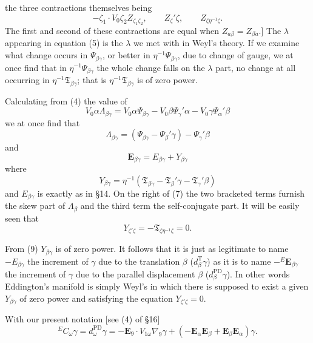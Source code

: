 \documentclass[11pt]{article}
\begin{document}
the three contractions themselves being
\[
-\zeta_1\mathbin{\cdot}V_0\zeta_2Z_{\zeta_1\zeta_2},\qquad Z_\zeta'\zeta,\qquad Z_{\zeta\eta^{-1}\zeta}.
\]
The first and second of these contractions are equal when $Z_{a\beta}=Z_{\beta a}$.]
\indent The $\lambda$ appearing in equation (5) is the $\lambda$ we met with in Weyl's theory. If we examine what change occurs in $\Psi_{\beta\gamma}$, or better in $\eta^{-1}\Psi_{\beta\gamma}$, due to change of gauge, we at once find that in $\eta^{-1}\Psi_{\beta\gamma}$ the whole change falls on the $\lambda$ part, no change at all occurring in $\eta^{-1}\mathfrak{T}_{\beta\gamma}$; that is $\eta^{-1}\mathfrak{T}_{\beta\gamma}$ is of zero power.

\indent Calculating from (4) the value of
\[
V_0\alpha\Lambda_{\beta\gamma}=V_0\alpha\Psi_{\beta\gamma}-V_0\beta\Psi_\gamma'\alpha-V_0\gamma\Psi_\alpha'\beta
\]
we at once find that
\begin{equation}\Lambda_{\beta\gamma}=(\Psi_{\beta\gamma}-\Psi_\beta'\gamma)-\Psi_\gamma'\beta\tag{7}\end{equation}
and
\begin{equation}\mathbf{E}_{\beta\gamma}=E_{\beta\gamma}+Y_{\beta\gamma}\tag{8}\end{equation}
where
\begin{equation}Y_{\beta\gamma}=\eta^{-1}(\mathfrak{T}_{\beta\gamma}-\mathfrak{T}_\beta'\gamma-\mathfrak{T}_\gamma'\beta)\tag{9}\end{equation}
and $E_{\beta\gamma}$ is exactly as in \S14. On the right of (7) the two bracketed terms furnish the skew part of $\Lambda_\beta$ and the third term the self-conjugate part. It will be easily seen that
\begin{equation}Y_{\zeta'\zeta}=-\mathfrak{T}_{\zeta\eta^{-1}\zeta}=0.\tag{10}\end{equation}

\indent From (9) $Y_{\beta\gamma}$ is of zero power. It follows that it is just as legitimate to name $-E_{\beta\gamma}$ the increment of $\gamma$ due to the translation $\beta$ ($d_\beta^{\mathrm T}\gamma$) as it is to name $-{}^E\mathbf{E}_{\beta\gamma}$ the increment of $\gamma$ due to the parallel displacement $\beta$ ($d_\beta^{\mathrm{PD}}\gamma$). In other words Eddington's manifold is simply Weyl's in which there is supposed to exist a given $Y_{\beta\gamma}$ of zero power and satisfying the equation $Y_{\zeta'\zeta}=0$.

\indent With our present notation [see (4) of \S16]
\begin{equation}{}^E C_\omega\gamma=d_\omega^{\mathrm{PD}}\gamma=-\mathbf{E}_9\mathbin{\cdot}V_{1\omega}\nabla_9\gamma+(-\mathbf{E}_\alpha\mathbf{E}_\beta+\mathbf{E}_\beta\mathbf{E}_\alpha)\gamma.\tag{11}\end{equation}
\end{document}
